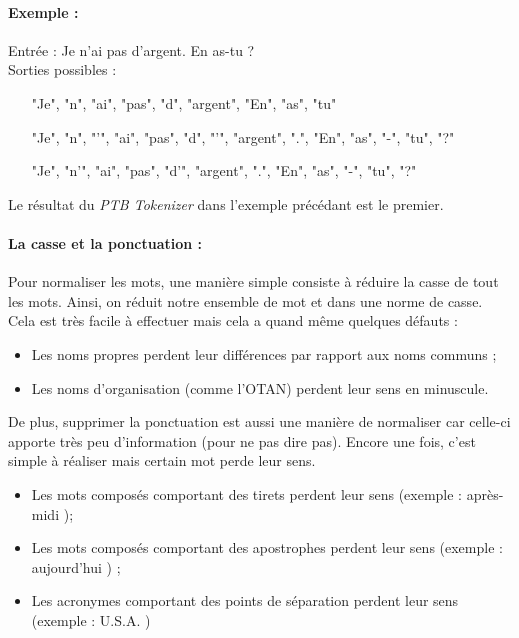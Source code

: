                     \paragraph{Exemple :}
                    Entrée : \og Je n'ai pas d'argent. En as-tu ? \fg\\
                    Sorties possibles :
                    \begin{itemize}
                        \item ["Je", "n", "ai", "pas", "d", "argent", "En", "as", "tu"]
                        \item ["Je", "n", "'", "ai", "pas", "d", "'", "argent", ".", "En", "as", "-", "tu", "?"]
                        \item ["Je", "n'", "ai", "pas", "d'", "argent", ".", "En", "as", "-", "tu", "?"]
                    \end{itemize}
                    Le résultat du \textit{PTB Tokenizer} dans l'exemple précédant est le premier.

                \paragraph{La casse et la ponctuation :}
                    Pour normaliser les mots, une manière simple consiste à réduire la casse de tout les mots. Ainsi, on réduit notre ensemble de mot et dans une norme de casse. Cela est très facile à effectuer mais cela a quand même quelques défauts :
                    \begin{itemize}
                        \item Les noms propres perdent leur différences par rapport aux noms communs ;
                        \item Les noms d'organisation (comme l'OTAN) perdent leur sens en minuscule.
                    \end{itemize}
                    De plus, supprimer la ponctuation est aussi une manière de normaliser car celle-ci apporte très peu d'information (pour ne pas dire pas). Encore une fois, c'est simple à réaliser mais certain mot perde leur sens.
                    \begin{itemize}
                        \item Les mots composés comportant des tirets perdent leur sens (exemple : \og après-midi \fg);
                        \item Les mots composés comportant des apostrophes perdent leur sens (exemple : \og aujourd'hui \fg) ;
                        \item Les acronymes comportant des points de séparation perdent leur sens (exemple : \og U.S.A. \fg)
                    \end{itemize}

